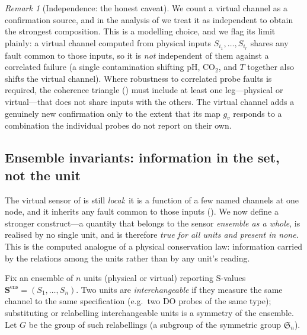 \documentclass[11pt,a4paper,twocolumn]{article}
\theoremstyle{thmstyle}
\theoremstyle{definition}
\theoremstyle{remark}
\newtheorem{remark}[theorem]{Remark}
\begin{document}
\begin{remark}[Independence: the honest caveat]
\label{rem:virtual-independence}
We count a virtual channel as a confirmation source, and in the analysis
of  we treat it as independent to obtain the
strongest composition. This is a modelling choice, and we flag its limit
plainly: a virtual channel computed from physical inputs
$S_{i_1},\dots,S_{i_r}$ shares any fault common to those inputs, so it is
\emph{not} independent of them against a correlated failure (a single
contamination shifting pH, $\mathrm{CO_2}$, and $T$ together also shifts
the virtual channel). Where robustness to correlated probe faults is
required, the coherence triangle () must include at
least one leg---physical or virtual---that does not share inputs with the
others. The virtual channel adds a genuinely new confirmation only to the
extent that its map $g_v$ responds to a combination the individual probes
do not report on their own.
\end{remark}

\subsection{Ensemble invariants: information in the set, not the unit}
\label{sec:invariant}

The virtual sensor of  is still \emph{local}: it is a
function of a few named channels at one node, and it inherits any fault
common to those inputs (). We now define a
stronger construct---a quantity that belongs to the sensor \emph{ensemble
as a whole}, is realised by no single unit, and is therefore
\emph{true for all units and present in none}. This is the computed
analogue of a physical conservation law: information carried by the
relations among the units rather than by any unit's reading.

Fix an ensemble of $n$ units (physical or virtual) reporting S-values
$\mathbf S^{\mathrm{ens}}=(S_1,\dots,S_n)$. Two units are
\emph{interchangeable} if they measure the same channel to the same
specification (e.g.\ two DO probes of the same type); substituting or
relabelling interchangeable units is a symmetry of the ensemble. Let
$G$ be the group of such relabellings (a subgroup of the symmetric group
$\mathfrak S_n$).
\end{document}
